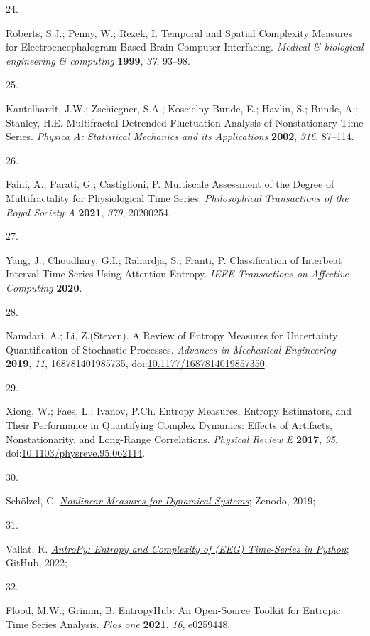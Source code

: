 \documentclass[
  man]{apa6}
\newlength{\cslhangindent}
\newlength{\csllabelwidth}
\newlength{\cslentryspacingunit} %
\newenvironment{CSLReferences}[2] %
 {%
  \setlength{\parindent}{0pt}
  \ifodd #1
  \let\oldpar\par
  \def\par{\hangindent=\cslhangindent\oldpar}
  \fi
  \setlength{\parskip}{#2\cslentryspacingunit}
 }%
 {}
\newcommand{\CSLLeftMargin}[1]{\parbox[t]{\csllabelwidth}{#1}}
\newcommand{\CSLRightInline}[1]{\parbox[t]{\linewidth - \csllabelwidth}{#1}\break}
\begin{document}
\begin{CSLReferences}{0}{0}
\leavevmode{}%
\CSLLeftMargin{24. }%
\CSLRightInline{Roberts, S.J.; Penny, W.; Rezek, I. Temporal and Spatial Complexity Measures for Electroencephalogram Based Brain-Computer Interfacing. \emph{Medical \& biological engineering \& computing} \textbf{1999}, \emph{37}, 93--98.}

\leavevmode{}%
\CSLLeftMargin{25. }%
\CSLRightInline{Kantelhardt, J.W.; Zschiegner, S.A.; Koscielny-Bunde, E.; Havlin, S.; Bunde, A.; Stanley, H.E. Multifractal Detrended Fluctuation Analysis of Nonstationary Time Series. \emph{Physica A: Statistical Mechanics and its Applications} \textbf{2002}, \emph{316}, 87--114.}

\leavevmode{}%
\CSLLeftMargin{26. }%
\CSLRightInline{Faini, A.; Parati, G.; Castiglioni, P. Multiscale Assessment of the Degree of Multifractality for Physiological Time Series. \emph{Philosophical Transactions of the Royal Society A} \textbf{2021}, \emph{379}, 20200254.}

\leavevmode{}%
\CSLLeftMargin{27. }%
\CSLRightInline{Yang, J.; Choudhary, G.I.; Rahardja, S.; Franti, P. Classification of Interbeat Interval Time-Series Using Attention Entropy. \emph{IEEE Transactions on Affective Computing} \textbf{2020}.}

\leavevmode{}%
\CSLLeftMargin{28. }%
\CSLRightInline{Namdari, A.; Li, Z.(Steven). A Review of Entropy Measures for Uncertainty Quantification of Stochastic Processes. \emph{Advances in Mechanical Engineering} \textbf{2019}, \emph{11}, 168781401985735, doi:\href{https://doi.org/10.1177/1687814019857350}{10.1177/1687814019857350}.}

\leavevmode{}%
\CSLLeftMargin{29. }%
\CSLRightInline{Xiong, W.; Faes, L.; Ivanov, P.Ch. Entropy Measures, Entropy Estimators, and Their Performance in Quantifying Complex Dynamics: Effects of Artifacts, Nonstationarity, and Long-Range Correlations. \emph{Physical Review E} \textbf{2017}, \emph{95}, doi:\href{https://doi.org/10.1103/physreve.95.062114}{10.1103/physreve.95.062114}.}

\leavevmode{}%
\CSLLeftMargin{30. }%
\CSLRightInline{Schölzel, C. \emph{\href{https://doi.org/10.5281/zenodo.3814723}{Nonlinear Measures for Dynamical Systems}}; Zenodo, 2019;}

\leavevmode{}%
\CSLLeftMargin{31. }%
\CSLRightInline{Vallat, R. \emph{\href{https://github.com/raphaelvallat/antropy}{AntroPy: Entropy and Complexity of (EEG) Time-Series in Python}}; GitHub, 2022;}

\leavevmode{}%
\CSLLeftMargin{32. }%
\CSLRightInline{Flood, M.W.; Grimm, B. EntropyHub: An Open-Source Toolkit for Entropic Time Series Analysis. \emph{Plos one} \textbf{2021}, \emph{16}, e0259448.}

\end{CSLReferences}


\clearpage
\renewcommand{\listfigurename}{Figure captions}
\end{document}
